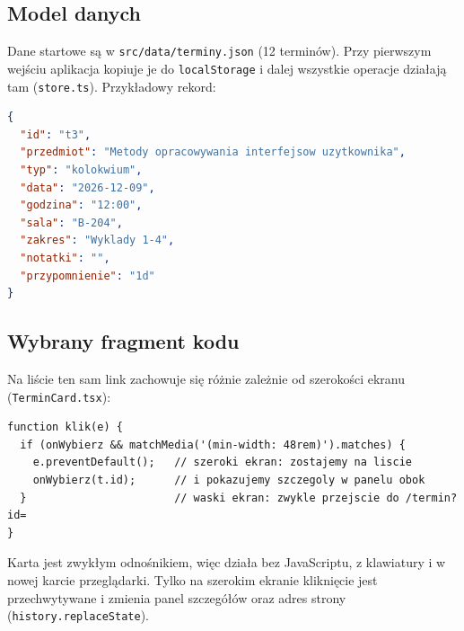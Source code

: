 \subsection{Model danych}
Dane startowe są w \texttt{src/data/terminy.json} (12 terminów). Przy pierwszym wejściu aplikacja kopiuje je do \texttt{localStorage} i dalej wszystkie operacje działają tam (\texttt{store.ts}). Przykładowy rekord:
\begin{lstlisting}[language=json]
{
  "id": "t3",
  "przedmiot": "Metody opracowywania interfejsow uzytkownika",
  "typ": "kolokwium",
  "data": "2026-12-09",
  "godzina": "12:00",
  "sala": "B-204",
  "zakres": "Wyklady 1-4",
  "notatki": "",
  "przypomnienie": "1d"
}
\end{lstlisting}

\subsection{Wybrany fragment kodu}
Na liście ten sam link zachowuje się różnie zależnie od szerokości ekranu (\texttt{TerminCard.tsx}):
\begin{lstlisting}
function klik(e) {
  if (onWybierz && matchMedia('(min-width: 48rem)').matches) {
    e.preventDefault();   // szeroki ekran: zostajemy na liscie
    onWybierz(t.id);      // i pokazujemy szczegoly w panelu obok
  }                       // waski ekran: zwykle przejscie do /termin?id=
}
\end{lstlisting}
Karta jest zwykłym odnośnikiem, więc działa bez JavaScriptu, z klawiatury i w nowej karcie przeglądarki.
Tylko na szerokim ekranie kliknięcie jest przechwytywane i zmienia panel szczegółów oraz adres strony
(\texttt{history.replaceState}).
